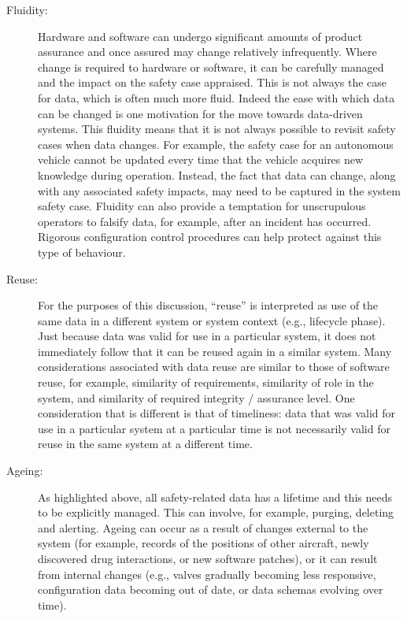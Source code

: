 \begin{description}
\item[Fluidity:] Hardware and software can undergo significant amounts of product assurance and once assured may change relatively infrequently. Where change is required to hardware or software, it can be carefully managed and the impact on the safety case appraised. This is not always the case for data, which is often much more fluid. Indeed the ease with which data can be changed is one motivation for the move towards \glspl{data-driven system}. This fluidity means that it is not always possible to revisit safety cases when data changes. For example, the safety case for an autonomous vehicle cannot be updated every time that the vehicle acquires new knowledge during operation. Instead, the fact that data can change, along with any associated safety impacts, may need to be captured in the system safety case. Fluidity can also provide a temptation for unscrupulous operators to falsify data, for example, after an incident has occurred. Rigorous configuration control procedures can help protect against this type of behaviour.

\item[Reuse:] For the purposes of this discussion, ``reuse'' is interpreted as use of the same data in a different system or system context (e.g., lifecycle phase). Just because data was valid for use in a particular system, it does not immediately follow that it can be reused again in a similar system. Many considerations associated with data reuse are similar to those of software reuse, for example, similarity of requirements, similarity of role in the system, and similarity of required \gls{integrity} / assurance level. One consideration that is different is that of \gls{timeliness}: data that was valid for use in a particular system at a particular time is not necessarily valid for reuse in the same system at a different time.

\item[Ageing:] As highlighted above, all safety-related data has a lifetime and this needs to be explicitly managed. This can involve, for example, purging, deleting and alerting. \cbstart Ageing can occur as a result of changes external to the system (for example, records of the positions of other aircraft, newly discovered drug interactions, or new software patches), or it can result from internal changes (e.g., valves gradually becoming less responsive, \gls{configuration data} becoming out of date, or data schemas evolving over time).\cbend\


\end{description}
